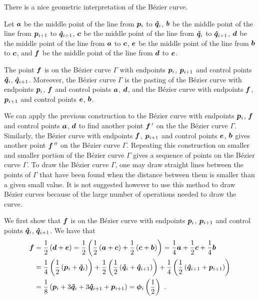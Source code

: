 \begin{rmk}
There is a nice geometric interpretation of the Bézier curve.

Let $\bm{a}$ be the middle point of the line from $\bm{p}_i$ to
$\bm{\check{q}}_i$, $\bm{b}$ be the middle point of the line from
$\bm{p}_{i+1}$ to $\bm{\hat{q}}_{i+1}$, $\bm{c}$ be the middle point of
the line from $\bm{\check{q}}_i$ to $\bm{\hat{q}}_{i+1}$, $\bm{d}$
be the middle point of the line from $\bm{a}$ to $\bm{c}$, $\bm{e}$
be the middle point of the line from $\bm{b}$ to $\bm{c}$, and
$\bm{f}$ be the middle point of the line from $\bm{d}$ to $\bm{e}$.

The point $\bm{f}$ is on the Bézier curve $\Gamma$ with endpoints
$\bm{p}_i$, $\bm{p}_{i+1}$ and control points $\bm{\check{q}}_i$,
$\bm{\hat{q}}_{i+1}$.  Moreover, the Bézier curve $\Gamma$ is the
pasting of the Bézier curve with endpoints $\bm{p}_i$, $\bm{f}$ and
control points $\bm{a}$, $\bm{d}$, and the Bézier curve with
endpoints $\bm{f}$, $\bm{p}_{i+1}$ and control points $\bm{e}$,
$\bm{b}$.

We can apply the previous construction to the Bézier curve with
endpoints $\bm{p}_i$, $\bm{f}$ and control points $\bm{a}$,
$\bm{d}$ to find another point $\bm{f}\,'$ on the the Bézier curve
$\Gamma$.  Similarly, the Bézier curve with endpoints $\bm{f}$,
$\bm{p}_{i+1}$ and control points $\bm{e}$, $\bm{b}$ gives another
point $\bm{f}\,''$ on the Bézier curve $\Gamma$.  Repeating this
construction on smaller and smaller portion of the Bézier curve
$\Gamma$ gives a sequence of points on the Bézier curve
$\Gamma$.  To draw the Bézier curve $\Gamma$, one may draw straight
lines between the points of $\Gamma$ that have been found when the
distance between them is smaller than a given small value.  It is not
suggested however to use this method to draw Bézier curves because
of the large number of operations needed to draw the curve.

We first show that $\bm{f}$ is on the Bézier curve with endpoints
$\bm{p}_i$, $\bm{p}_{i+1}$ and control points $\bm{\check{q}}_i$,
$\bm{\hat{q}}_{i+1}$.  We have that
\begin{align*}
\bm{f} & = \frac{1}{2} \left(\bm{d}+\bm{e}\right)
= \frac{1}{2} \left( \frac{1}{2}\left(\bm{a}+\bm{c}\right) +
\frac{1}{2}\left(\bm{c}+\bm{b}\right) \right)
= \frac{1}{4} \bm{a} + \frac{1}{2} \bm{c} + \frac{1}{4} \bm{b} \\
 & = \frac{1}{4} \left(\frac{1}{2}\left(\bm{p}_i
+\bm{\check{q}}_i\right)\right)
+ \frac{1}{2} \left(\frac{1}{2}\left(\bm{\check{q}}_i
+\bm{\hat{q}}_{i+1}\right)\right)
+ \frac{1}{4} \left(\frac{1}{2}\left(\bm{\hat{q}}_{i+1}
+\bm{p}_{i+1}\right)\right) \\
& = \frac{1}{8} \left( \bm{p}_i + 3 \bm{\check{q}}_i
+ 3 \bm{\hat{q}}_{i+1} + \bm{p}_{i+1} \right)
= \bm{\phi}_i\left(\frac{1}{2}\right)\ .
\end{align*}


\end{rmk}
